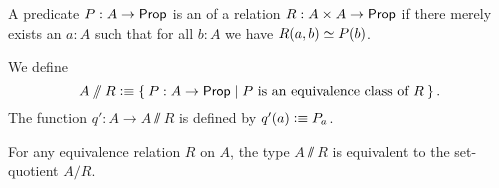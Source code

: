 \documentclass[hott-all.tex]{subfiles}
\begin{document}
% 
\begin{defn}
  A predicate $P:A\to\mathsf{Prop}$ is an 
  of a relation $R : A \times A \to \mathsf{Prop}$ if there merely exists an $a:A$ such that for all $b:A$ we have $R(a,b) \simeq P(b)$.
\end{defn}
% 
% 
\begin{defn}
  We define
  \begin{equation*}
    A\sslash R \defeq \setof{ P:A\to\prop | P \text{ is an equivalence class of } R}.
  \end{equation*}
  The function $q':A\to A\sslash R$ is defined by $q'(a) \vcentcolon\equiv P_a$.
\end{defn}
% 
\begin{thm}
  For any equivalence relation $R$ on $A$, the type $A\sslash R$ is equivalent to the set-quotient $A/R$.
\end{thm}
% 
% 
\end{document}
